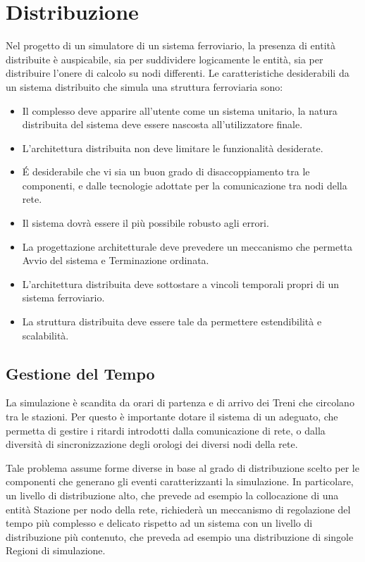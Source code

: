 \section{Distribuzione}

Nel progetto di un simulatore di un sistema ferroviario, la presenza di entità distribuite è auspicabile, sia per suddividere logicamente le entità, sia per distribuire l'onere di calcolo su nodi differenti.
Le caratteristiche desiderabili da un sistema distribuito che simula una struttura ferroviaria sono:
	\begin{itemize}
		\item Il complesso deve apparire all'utente come un sistema unitario, la natura distribuita del sistema deve essere nascosta all'utilizzatore finale. 
		\item L'architettura distribuita non deve limitare le funzionalità desiderate.
		\item \'E desiderabile che vi sia un buon grado di disaccoppiamento tra le componenti, e dalle tecnologie adottate per la comunicazione tra nodi della rete.
		\item Il sistema dovrà essere il più possibile robusto agli errori.
		\item La progettazione architetturale deve prevedere un meccanismo che permetta Avvio del sistema e Terminazione ordinata.
		\item L'architettura distribuita deve sottostare a vincoli temporali propri di un sistema ferroviario.
		\item La struttura distribuita deve essere tale da permettere estendibilità e scalabilità.
	\end{itemize}

	\subsection{Gestione del Tempo}
	
	La simulazione è scandita da orari di partenza e di arrivo dei Treni che circolano tra le stazioni. Per questo è importante dotare il sistema di un  adeguato, che permetta di gestire i ritardi introdotti dalla comunicazione di rete, o dalla diversità di sincronizzazione degli orologi dei diversi nodi della rete.
	 
	Tale problema assume forme diverse in base al grado di distribuzione scelto per le componenti che generano gli eventi caratterizzanti la simulazione. In particolare, un livello di distribuzione alto, che prevede ad esempio la collocazione di una entità Stazione per nodo della rete, richiederà un meccanismo di regolazione del tempo più complesso e delicato rispetto ad un sistema con un livello di distribuzione più contenuto, che preveda ad esempio una distribuzione di singole Regioni di simulazione. 
	
